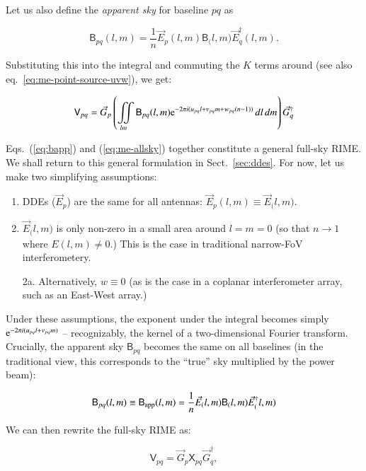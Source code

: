 \documentclass[]{aa}
\newcommand{\jones}[2]{\vec {#1}_{#2}}
\newcommand{\jonesT}[2]{\vec {#1}^\dagger_{#2}}
\newcommand{\coh}[2]{\mathsf{{#1}}_{{#2}}}
\begin{document}
Let us also define the {\em apparent sky} for baseline $pq$ as

\begin{equation}\label{eq:bapp}
\coh{B}{pq}(l,m) = \frac{1}{n} \jones{E}{p}(l,m)  \coh{B}(l,m) \jonesT{E}{q}(l,m).
\end{equation}

Substituting this into the integral and commuting the $K$ terms around (see also eq.~\ref{eq:me-point-source-uvw}), we get:

\begin{equation}\label{eq:me-allsky}
\coh{V}{pq} = \jones{G}{p} \left( \iint\limits_{lm} \coh{B}{pq}(l,m) {\rm e}^{-2\pi i(u_{pq} l+v_{pq} m+w_{pq} (n-1))} \,dl\,dm \right) \jonesT{G}{q}
\end{equation}

Eqs.~(\ref{eq:bapp}) and (\ref{eq:me-allsky}) together constitute a general full-sky RIME. We shall return to this general formulation in Sect.~\ref{sec:ddes}. For now, let us make two simplifying assumptions:

\begin{enumerate}
\item DDEs ($\jones{E}{p}$) are the same for all antennas: $\jones{E}{p}(l,m) \equiv \jones{E}(l,m)$. 
\item $\jones{E}(l,m)$ is only non-zero in a small area around $l=m=0$ (so that $n\to 1$ where $E(l,m) \ne 0.$) This is the case in traditional narrow-FoV interferometery.
\item[2a.] Alternatively, $w\equiv0$ (as is the case in a  coplanar interferometer array, such as an East-West array.)
\end{enumerate}

Under these assumptions, the exponent under the integral becomes simply ${\rm e}^{-2\pi i(u_{pq} l+v_{pq}m)}$ -- recognizably, the kernel of a two-dimensional Fourier transform. Crucially, the apparent sky $\coh{B}{pq}$ becomes the same on all baselines (in the traditional view, this corresponds to the ``true'' sky multiplied by the power beam): 

  \[
  \coh{B}{pq}(l,m) \equiv \coh{B}{\rm app}(l,m) =  \frac{1}{n} \jones{E}(l,m) \coh{B}(l,m) \jonesT{E}(l,m)
  \]

We can then rewrite the full-sky RIME as:

\begin{equation}\label{eq:me-allsky-simple}
\coh{V}{pq} = \jones{G}{p} \coh{X}{pq} \jonesT{G}{q},
\end{equation}
\end{document}
